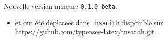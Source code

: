 Nouvelle version mineure \verb+0.1.0-beta+. 
    
\begin{itemize}[itemsep=.5em]
    \item {}  et  ont été déplacées dans \texttt{tnsarith} disponible sur \url{https://github.com/typensee-latex/tnsarith.git}.
\end{itemize}


\separation